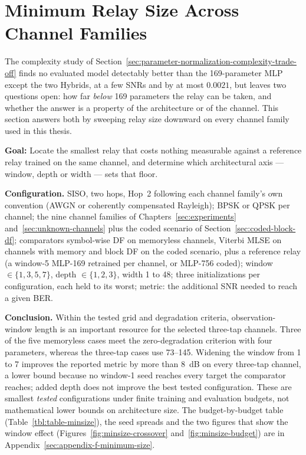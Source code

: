 \section{Minimum Relay Size Across Channel Families}\label{sec:minimum-relay-size}

The complexity study of Section~\ref{sec:parameter-normalization-complexity-trade-off} finds no evaluated model detectably better than the 169-parameter MLP except the two Hybrids, at a few SNRs and by at most $0.0021$, but leaves two questions open: how far \emph{below} 169 parameters the relay can be taken, and whether the answer is a property of the architecture or of the channel. This section answers both by sweeping relay size downward on every channel family used in this thesis.

\textbf{Goal:} Locate the smallest relay that costs nothing measurable against a reference relay trained on the same channel, and determine which architectural axis --- window, depth or width --- sets that floor.

\textbf{Configuration.} SISO, two hops, Hop~2 following each channel family's own convention (AWGN or coherently compensated Rayleigh); BPSK or QPSK per channel; the nine channel families of Chapters~\ref{sec:experiments} and~\ref{sec:unknown-channels} plus the coded scenario of Section~\ref{sec:coded-block-df}; comparators symbol-wise DF on memoryless channels, Viterbi MLSE on channels with memory and block DF on the coded scenario, plus a reference relay (a window-5 MLP-169 retrained per channel, or MLP-756 coded); window $\in\{1,3,5,7\}$, depth $\in\{1,2,3\}$, width 1 to 48; three initializations per configuration, each held to its worst; metric: the additional SNR needed to reach a given BER.

\textbf{Conclusion.} Within the tested grid and degradation criteria, observation-window length is an important resource for the selected three-tap channels. Three of the five memoryless cases meet the zero-degradation criterion with four parameters, whereas the three-tap cases use 73--145. Widening the window from 1 to 7 improves the reported metric by more than 8~dB on every three-tap channel, a lower bound because no window-1 seed reaches every target the comparator reaches; added depth does not improve the best tested configuration. These are smallest \emph{tested} configurations under finite training and evaluation budgets, not mathematical lower bounds on architecture size. The budget-by-budget table (Table~\ref{tbl:table-minsize}), the seed spreads and the two figures that show the window effect (Figures~\ref{fig:minsize-crossover} and~\ref{fig:minsize-budget}) are in Appendix~\ref{sec:appendix-f-minimum-size}.

